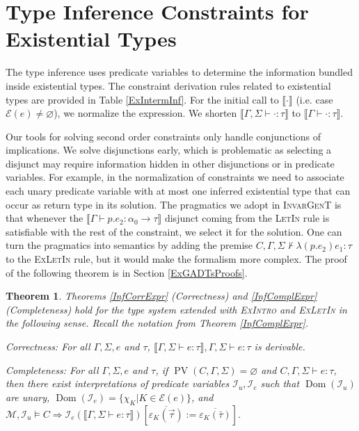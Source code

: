 \documentclass{article}
\newcommand{\assign}{:=}
\newcommand{\cdummy}{\cdot}
\newcommand{\tmname}[1]{\textsc{#1}}
\newcommand{\tmop}[1]{\ensuremath{\operatorname{#1}}}
\newtheorem{theorem}{Theorem}
\begin{document}
\section{Type Inference Constraints for Existential Types}\label{ExTypesCns}

The type inference uses predicate variables to determine the information
bundled inside existential types. The constraint derivation rules related to
existential types are provided in Table \ref{ExIntermInf}. For the initial
call to $\llbracket \cdummy \rrbracket$ (i.e. case $\mathcal{E} (e) \neq
\varnothing$), we normalize the expression. We shorten $\llbracket \Gamma,
\Sigma \vdash \cdummy : \tau \rrbracket$ to $\llbracket \Gamma \vdash \cdummy
: \tau \rrbracket$.

Our tools for solving second order constraints only handle conjunctions of
implications. We solve disjunctions early, which is problematic as selecting a
disjunct may require information hidden in other disjunctions or in predicate
variables. For example, in the normalization of constraints we need to
associate each unary predicate variable with at most one inferred existential
type that can occur as return type in its solution. The pragmatics we adopt in
{\tmname{InvarGenT}} is that whenever the $\llbracket \Gamma \vdash p.e_2 :
\alpha_0 \rightarrow \tau \rrbracket$ disjunct coming from the
{\tmname{LetIn}} rule is satisfiable with the rest of the constraint, we
select it for the solution. One can turn the pragmatics into semantics by
adding the premise $C, \Gamma, \Sigma \nvdash \lambda (p.e_2) e_1 : \tau$ to
the {\tmname{ExLetIn}} rule, but it would make the formalism more complex. The
proof of the following theorem is in Section \ref{ExGADTsProofs}.

\begin{theorem}
  \label{InfCorrComplEx}Theorems \ref{InfCorrExpr} (Correctness) and
  \ref{InfComplExpr} (Completeness) hold for the type system extended with
  {\tmname{ExIntro}} and {\tmname{ExLetIn}} in the following sense. Recall the
  notation from Theorem \ref{InfComplExpr}.
  
  Correctness: For all $\Gamma, \Sigma, e$ and $\tau$, $\llbracket \Gamma,
  \Sigma \vdash e : \tau \rrbracket, \Gamma, \Sigma \vdash e : \tau$ is
  derivable.
  
  Completeness: For all $\Gamma, \Sigma, e$ and $\tau$, if $\tmop{PV} (C,
  \Gamma, \Sigma) = \varnothing$ and $C, \Gamma, \Sigma \vdash e : \tau$, then
  there exist interpretations of predicate variables $\mathcal{I}_u,
  \mathcal{I}_e$ such that $\tmop{Dom} (\mathcal{I}_u)$ are unary, $\tmop{Dom}
  (\mathcal{I}_e) = \{ \chi_K | K \in \mathcal{E} (e) \}$, and $\mathcal{M},
  \mathcal{I}_u \vDash C \Rightarrow \mathcal{I}_e (\llbracket \Gamma, \Sigma
  \vdash e : \tau \rrbracket) [\overline{\varepsilon_K (\vec{\tau})} \assign
  \overline{\varepsilon_K (\bar{\tau})}]$.
\end{theorem}
\end{document}
